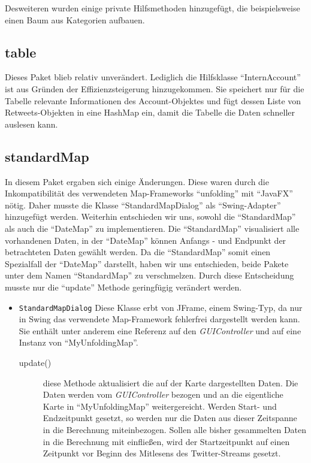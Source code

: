 Desweiteren wurden einige private Hilfsmethoden hinzugefügt, die beispielsweise einen Baum aus Kategorien aufbauen.

\subsection{table}
Dieses Paket blieb relativ unverändert. Lediglich die Hilfsklasse "`InternAccount"' ist aus Gründen der Effizienzsteigerung hinzugekommen.
Sie speichert nur für die Tabelle relevante Informationen des Account-Objektes und fügt dessen Liste von Retweets-Objekten in eine HashMap ein, damit die Tabelle die Daten schneller auslesen kann.
		
\subsection{standardMap}
In diesem Paket ergaben sich einige Änderungen. Diese waren durch die Inkompatibilität des verwendeten Map-Frameworks "`unfolding"' mit "`JavaFX"' nötig. Daher musste die Klasse "`StandardMapDialog"' als "`Swing-Adapter"' hinzugefügt werden. Weiterhin entschieden wir uns, sowohl  die "`StandardMap"' als auch die "`DateMap"' zu implementieren. Die "`StandardMap"' visualisiert alle vorhandenen Daten, in der "`DateMap"' können Anfangs - und Endpunkt der betrachteten Daten gewählt werden. Da die "`StandardMap"' somit einen Spezialfall der "`DateMap"' darstellt, haben wir uns entschieden, beide Pakete unter dem Namen "`StandardMap"' zu verschmelzen. Durch diese Entscheidung musste nur die "`update"' Methode geringfügig verändert werden.
\begin{itemize}
	\item \lstinline{StandardMapDialog}
	\quad
	Diese Klasse erbt von JFrame, einem  Swing-Typ, da nur in Swing das verwendete Map-Framework fehlerfrei dargestellt werden kann. Sie enthält unter anderem eine Referenz auf den \emph{GUIController} und auf eine Instanz von "`MyUnfoldingMap"'.
	\begin{description}
		\item[update()] diese Methode aktualisiert die auf der Karte dargestellten Daten. Die Daten werden vom \emph{GUIController} bezogen und an die eigentliche Karte in "`MyUnfoldingMap"' weitergereicht. Werden Start- und Endzeitpunkt gesetzt, so werden nur die Daten aus dieser Zeitspanne in die Berechnung miteinbezogen. Sollen alle bisher gesammelten Daten in die Berechnung mit einfließen, wird der Startzeitpunkt auf einen Zeitpunkt vor Beginn des Mitlesens des Twitter-Streams gesetzt.
	\end{description}
\end{itemize}
		
